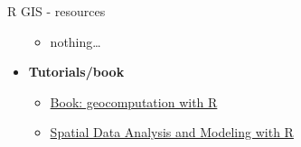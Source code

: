 \documentclass[8pt,ignorenonframetext,]{beamer}
\providecommand{\tightlist}{%
  \setlength{\itemsep}{0pt}\setlength{\parskip}{0pt}}
\begin{document}
\begin{frame}[fragile]{R GIS - resources}
\begin{itemize}
  \begin{itemize}
  \tightlist
  \item
    nothing\ldots{}
  \end{itemize}
\item
  \textbf{Tutorials/book}

  \begin{itemize}
  \tightlist
  \item
    \href{https://bookdown.org/robinlovelace/geocompr}{Book:
    geocomputation with R}
  \item
    \href{http://rspatial.org/intr/index.html}{Spatial Data Analysis and
    Modeling with R}
  \end{itemize}
\end{itemize}

\end{frame}
\end{document}
